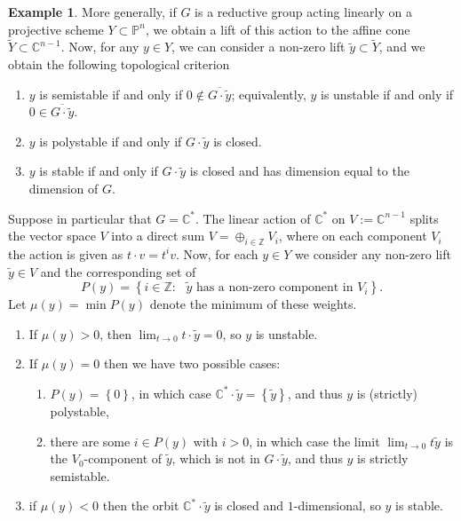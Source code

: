 \documentclass[12pt,a4paper]{amsbook}
\theoremstyle{remark} \newtheorem{rmk}[thm]{Remark}
\theoremstyle{definition} \newtheorem{defn}[thm]{Definition}
\theoremstyle{definition} \newtheorem{ex}[thm]{Example}
\theoremstyle{definition} \newtheorem{ej}{Exercise}
\let\emph\relax
\newcommand{\C}{\mathbb C}
\newcommand{\Z}{\mathbb Z}
\newcommand{\bbP}{\mathbb P}
\begin{document}
\begin{ex}
More generally, if $G$ is a reductive group acting linearly on a projective scheme $Y\subset \bbP^n$, we obtain a lift of this action to the affine cone $\tilde{Y}\subset \C^{n-1}$. Now, for any $y\in Y$, we can consider a non-zero lift $\tilde{y}\subset \tilde{Y}$, and we obtain the following topological criterion
\begin{enumerate}
\item $y$ is semistable if and only if $0\not \in \overline{G\cdot \tilde{y}}$; equivalently, $y$ is unstable if and only if $0 \in \overline{G\cdot \tilde{y}}$.
\item $y$ is polystable if and only if $G\cdot \tilde{y}$ is closed.
\item $y$ is stable if and only if $G\cdot \tilde{y}$ is closed and has dimension equal to the dimension of $G$.
\end{enumerate}

Suppose in particular that $G=\C^*$. The linear action of $\C^*$ on $V:=\C^{n-1}$ splits the vector space $V$ into a direct sum $V=\oplus_{i\in \Z} V_i$, where on each component $V_i$ the action is given as $t \cdot v=t^iv$. Now, for each $y\in Y$ we consider any non-zero lift $\tilde{y}\in V$ and the corresponding set of \emph{weights}
\begin{equation*}
P(y) = \left\{ i \in \Z : \text{ $\tilde{y}$ has a non-zero component in } V_i  \right\}.
\end{equation*}
Let $\mu(y)=\min P(y)$ denote the minimum of these weights.
\begin{enumerate}
\item If $\mu(y)>0$, then $\lim_{t\rightarrow 0} t\cdot \tilde{y}=0$, so $y$ is unstable.
  \item If $\mu(y)=0$ then we have two possible cases:
        \begin{enumerate}
          \item  $P(y)=\left\{ 0 \right\}$, in which case $\C^*\cdot \tilde{y}= \left\{  \tilde{y} \right\}$, and thus $y$ is (strictly) polystable,
        \item there are some $i\in P(y)$ with $i>0$, in which case the limit $\lim_{t\rightarrow 0}t \tilde{y}$ is the $V_0$-component of $\tilde{y}$, which is not in $G\cdot \tilde{y}$, and thus $y$ is strictly semistable.
        \end{enumerate}
\item if $\mu(y)<0$ then the orbit $\C^* \cdot \tilde{y}$ is closed and $1$-dimensional, so $y$ is stable.
\end{enumerate}
\end{ex}
\end{document}
